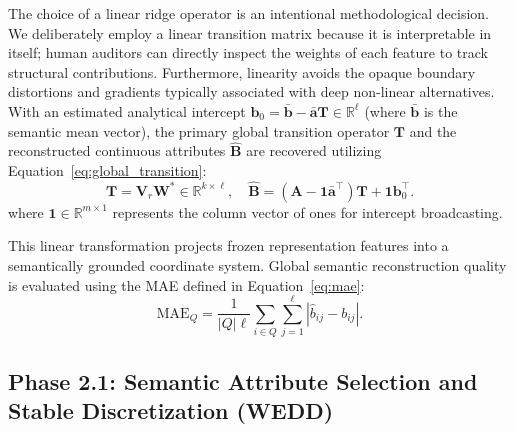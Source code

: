 \documentclass[make,article,submit,pdftex,moreauthors]{Definitions/mdpi}
\newcommand{\matA}{\mathbf{A}}
\newcommand{\hatB}{\widehat{\mathbf{B}}}
\newcommand{\matT}{\mathbf{T}}
\newcommand{\matW}{\mathbf{W}}
\newcommand{\matV}{\mathbf{V}}
\newcommand{\R}{\mathbb{R}}
\begin{document}
The choice of a linear ridge operator is an intentional methodological decision. We deliberately employ a linear transition matrix because it is interpretable in itself; human auditors can directly inspect the weights of each feature to track structural contributions. Furthermore, linearity avoids the opaque boundary distortions and gradients typically associated with deep non-linear alternatives. With an estimated analytical intercept $\mathbf{b}_0 = \bar{\mathbf{b}} - \bar{\mathbf{a}} \matT \in \R^{\ell}$ (where $\bar{\mathbf{b}}$ is the semantic mean vector), the primary global transition operator $\matT$ and the reconstructed continuous attributes $\hatB$ are recovered utilizing Equation~\eqref{eq:global_transition}:
\begin{equation}
 \label{eq:global_transition}
 \matT = \matV_r\matW^{\ast} \in \R^{k \times \ell}, \quad \hatB = (\matA - \mathbf{1}\bar{\mathbf{a}}^{\top})\matT + \mathbf{1}\mathbf{b}_0^{\top}.
\end{equation}
where $\mathbf{1} \in \mathbb{R}^{m \times 1}$ represents the column vector of ones for intercept broadcasting.


This linear transformation projects frozen representation features into a semantically grounded coordinate system. Global semantic reconstruction quality is evaluated using the MAE defined in Equation~\eqref{eq:mae}:
\begin{equation}
 \label{eq:mae}
 \mathrm{MAE}_Q = \frac{1}{|Q|\ell} \sum_{i \in Q} \sum_{j=1}^{\ell} |\hat{b}_{ij} - b_{ij}|.
\end{equation}

\subsection{Phase 2.1: Semantic Attribute Selection and Stable Discretization (WEDD)}
\label{subsec:methods_wedd}
\end{document}
